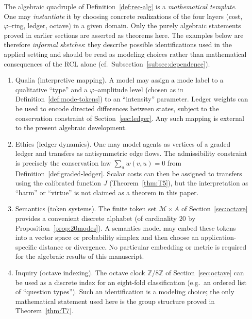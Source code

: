 \documentclass[11pt,reqno]{amsart}
\theoremstyle{plain}
\theoremstyle{definition}
\theoremstyle{remark}
\newcommand{\Jcost}{J}
\newcommand{\1}{\mathbf{1}}
\newcommand{\paperadd}[1]{{\color{paperblue}#1}}
\begin{document}
The algebraic quadruple of Definition~\ref{def:rec-alg} is a \emph{mathematical
template}. One may \emph{instantiate} it by choosing concrete realizations of
the four layers (cost, $\varphi$--ring, ledger, octave) in a given domain.
Only the purely algebraic statements proved in earlier sections are asserted
as theorems here. The examples below are therefore \emph{informal sketches}:
they describe possible identifications used in the applied setting and should be read as modeling choices rather than mathematical
consequences of the RCL alone (cf.~Subsection~\ref{subsec:dependence}).
\begin{enumerate}[leftmargin=*]
\item Qualia (interpretive mapping). A model may assign a mode label to a qualitative ``type'' and a $\varphi$--amplitude level (chosen as in Definition~\ref{def:mode-tokens}) to an ``intensity'' parameter. Ledger weights can be used to encode directed differences between states, subject to the conservation constraint of Section~\ref{sec:ledger}. Any such mapping is external to the present algebraic development.
\item Ethics (ledger dynamics). One may model agents as vertices of a graded ledger and transfers as antisymmetric edge flows. The admissibility constraint is precisely the conservation law $\sum_{u}w(v,u)=0$ from Definition~\ref{def:graded-ledger}. Scalar costs can then be assigned to transfers using the calibrated function $\Jcost$ (Theorem~\ref{thm:T5}), but the interpretation as ``harm'' or ``virtue'' is not claimed as a theorem in this paper.
\item Semantics (token systems). The finite token set $\mathcal{M}\times A$ of Section~\ref{sec:octave} provides a convenient discrete alphabet (of cardinality $20$ by Proposition~\ref{prop:20modes}). A semantics model may embed these tokens into a vector space or probability simplex and then choose an \paperadd{application-specific} distance or divergence. No particular embedding or metric is required for the algebraic results of this manuscript.
\item Inquiry (octave indexing). The octave clock $\mathbb{Z}/8\mathbb{Z}$ of Section~\ref{sec:octave} can be used as a discrete index for an eight-fold classification (e.g.\ an ordered list of ``question types''). Such an identification is a modeling choice; the only mathematical statement used here is the group structure proved in Theorem~\ref{thm:T7}.
\end{enumerate} %
\end{document}
